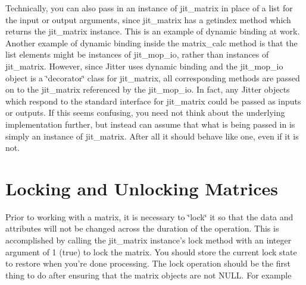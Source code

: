 Technically, you can also pass in an instance of jit\_\-matrix in place of a list for the input or output arguments, since jit\_\-matrix has a getindex method which returns the jit\_\-matrix instance. This is an example of dynamic binding at work. Another example of dynamic binding inside the matrix\_\-calc method is that the list elements might be instances of jit\_\-mop\_\-io, rather than instances of jit\_\-matrix. However, since Jitter uses dynamic binding and the jit\_\-mop\_\-io object is a \char`\"{}decorator\char`\"{} class for jit\_\-matrix, all corresponding methods are passed on to the jit\_\-matrix referenced by the jit\_\-mop\_\-io. In fact, any Jitter objects which respond to the standard interface for jit\_\-matrix could be passed as inputs or outputs. If this seems confusing, you need not think about the underlying implementation further, but instead can assume that what is being passed in is simply an instance of jit\_\-matrix. After all it should behave like one, even if it is not.\hypertarget{chapter_jit_mopdetails_chapter_jit_mopdetails_locking}{}\section{Locking and Unlocking Matrices}\label{chapter_jit_mopdetails_chapter_jit_mopdetails_locking}
Prior to working with a matrix, it is necessary to \char`\"{}lock\char`\"{} it so that the data and attributes will not be changed across the duration of the operation. This is accomplished by calling the jit\_\-matrix instance's lock method with an integer argument of 1 (true) to lock the matrix. You should store the current lock state to restore when you're done processing. The lock operation should be the first thing to do after ensuring that the matrix objects are not NULL. For example


